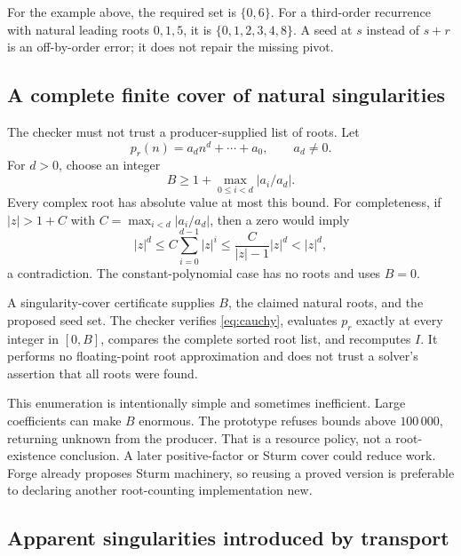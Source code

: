 For the example above, the required set is $\{0,6\}$. For a third-order
recurrence with natural leading roots $0,1,5$, it is
$\{0,1,2,3,4,8\}$. A seed at $s$ instead of $s+r$ is an off-by-order error;
it does not repair the missing pivot.

\subsection{A complete finite cover of natural singularities}

The checker must not trust a producer-supplied list of roots. Let
\[
p_r(n)=a_dn^d+\cdots+a_0,\qquad a_d\ne0.
\]
For $d>0$, choose an integer
\begin{equation}\label{eq:cauchy}
B\ge1+\max_{0\le i<d}|a_i/a_d|.
\end{equation}
Every complex root has absolute value at most this bound. For completeness,
if $|z|>1+C$ with $C=\max_{i<d}|a_i/a_d|$, then a zero would imply
\[
|z|^d\le C\sum_{i=0}^{d-1}|z|^i
\le\frac{C}{|z|-1}|z|^d<|z|^d,
\]
a contradiction. The constant-polynomial case has no roots and uses $B=0$.

A singularity-cover certificate supplies $B$, the claimed natural roots, and
the proposed seed set. The checker verifies \eqref{eq:cauchy}, evaluates $p_r$
exactly at every integer in $[0,B]$, compares the complete sorted root list, and
recomputes $I$. It performs no floating-point root approximation and does not
trust a solver's assertion that all roots were found.

This enumeration is intentionally simple and sometimes inefficient. Large
coefficients can make $B$ enormous. The prototype refuses bounds above
$100\,000$, returning unknown from the producer. That is a resource policy,
not a root-existence conclusion. A later positive-factor or Sturm cover could
reduce work. Forge already proposes Sturm machinery, so reusing a proved
version is preferable to declaring another root-counting implementation new.


\subsection{Apparent singularities introduced by transport}

